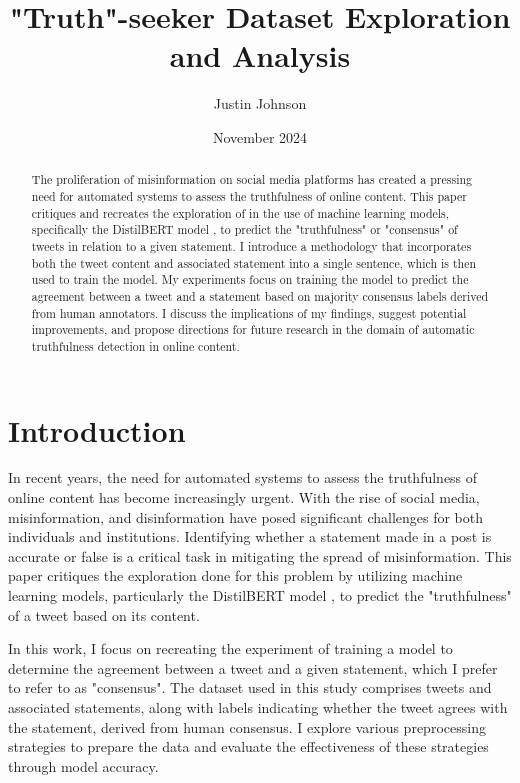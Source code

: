 \documentclass[14]{article}
\title{"Truth"-seeker Dataset Exploration and Analysis}
\author{Justin Johnson}
\date{November 2024}
\begin{document}
\maketitle

\begin{abstract}
The proliferation of misinformation on social media platforms has created a pressing need for automated systems to assess the truthfulness of online content. This paper critiques and recreates the exploration of \citealt{truthseeker} in the use of machine learning models, specifically the DistilBERT model \cite{distilbert}, to predict the "truthfulness" or "consensus" of tweets in relation to a given statement. I introduce a methodology that incorporates both the tweet content and associated statement into a single sentence, which is then used to train the model. My experiments focus on training the model to predict the agreement between a tweet and a statement based on majority consensus labels derived from human annotators. I discuss the implications of my findings, suggest potential improvements, and propose directions for future research in the domain of automatic truthfulness detection in online content.
\end{abstract}

\section{Introduction}

In recent years, the need for automated systems to assess the truthfulness of online content has become increasingly urgent. With the rise of social media, misinformation, and disinformation have posed significant challenges for both individuals and institutions. Identifying whether a statement made in a post is accurate or false is a critical task in mitigating the spread of misinformation. This paper critiques the exploration done for this problem \cite{truthseeker} by utilizing machine learning models, particularly the DistilBERT model \cite{distilbert}, to predict the "truthfulness" of a tweet based on its content.

In this work, I focus on recreating the experiment of training a model to determine the agreement between a tweet and a given statement, which I prefer to refer to as "consensus". The dataset used in this study comprises tweets and associated statements, along with labels indicating whether the tweet agrees with the statement, derived from human consensus. I explore various preprocessing strategies to prepare the data and evaluate the effectiveness of these strategies through model accuracy.
\end{document}
